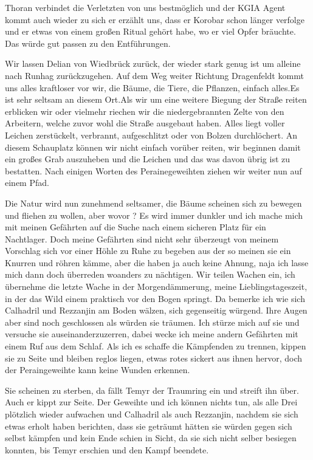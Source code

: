Thoran verbindet die Verletzten von uns bestmöglich und der KGIA Agent kommt auch wieder zu sich er erzählt uns, dass er Korobar schon länger verfolge und er etwas von einem großen Ritual gehört habe, wo er viel Opfer bräuchte. Das würde gut passen zu den Entführungen.\par
Wir lassen Delian von Wiedbrück zurück, der wieder stark genug ist um alleine nach Runhag zurückzugehen.
Auf dem Weg weiter Richtung Dragenfeldt  kommt uns alles kraftloser vor wir, die Bäume, die Tiere, die Pflanzen, einfach alles.Es ist sehr seltsam an diesem Ort.Als wir um eine weitere Biegung der Straße reiten erblicken wir oder vielmehr riechen wir die niedergebrannten Zelte von den Arbeitern, welche zuvor wohl die Straße ausgebaut haben. Alles liegt voller Leichen zerstückelt, verbrannt, aufgeschlitzt oder von Bolzen durchlöchert. An diesem Schauplatz können wir nicht einfach vorüber reiten, wir beginnen damit ein großes Grab auszuheben und die Leichen und das was davon übrig ist zu bestatten. Nach einigen Worten des Perainegeweihten ziehen wir weiter nun auf einem Pfad.\par
Die Natur wird nun zunehmend seltsamer, die Bäume scheinen sich zu bewegen und fliehen zu wollen, aber wovor ? Es wird immer dunkler und ich mache mich mit meinen Gefährten auf die Suche nach einem sicheren Platz für ein Nachtlager. Doch meine Gefährten sind nicht sehr überzeugt von meinem Vorschlag sich vor einer Höhle zu Ruhe zu begeben aus der so meinen sie ein Knurren und röhren kämme, aber die haben ja auch keine Ahnung, naja ich lasse mich dann doch überreden woanders zu nächtigen. Wir teilen Wachen ein, ich übernehme die letzte Wache in der Morgendämmerung, meine Lieblingstageszeit, in der das Wild einem praktisch vor den Bogen springt. Da bemerke ich wie sich Calhadril und Rezzanjin am Boden wälzen, sich gegenseitig würgend. Ihre Augen aber sind noch geschlossen als würden sie träumen. Ich stürze mich auf sie und versuche sie auseinanderzuzerren, dabei wecke ich meine andern Gefährten mit einem Ruf aus dem Schlaf. Als ich es schaffe die Kämpfenden zu trennen, kippen sie zu Seite und bleiben reglos liegen, etwas rotes sickert aus ihnen hervor, doch der Peraingeweihte kann keine Wunden erkennen.\par
Sie scheinen zu sterben, da fällt Temyr der Traumring ein und streift ihn über. Auch er kippt zur Seite. Der Geweihte und ich können nichts tun, als alle Drei plötzlich wieder aufwachen und Calhadril als auch Rezzanjin, nachdem sie sich etwas erholt haben berichten, dass sie geträumt hätten sie würden gegen sich selbst kämpfen und kein Ende schien in Sicht, da sie sich nicht selber besiegen konnten, bis Temyr erschien und den Kampf beendete.\par
